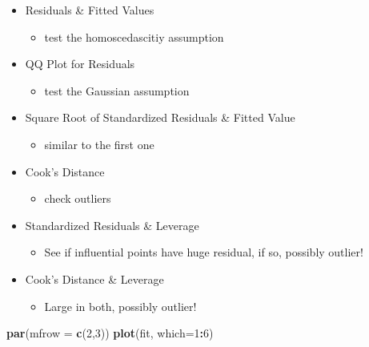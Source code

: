 \documentclass[
]{ctexart}
\newenvironment{Shaded}{\begin{snugshade}}{\end{snugshade}}
\newcommand{\AttributeTok}[1]{\textcolor[rgb]{0.13,0.29,0.53}{#1}}
\newcommand{\DecValTok}[1]{\textcolor[rgb]{0.00,0.00,0.81}{#1}}
\newcommand{\FunctionTok}[1]{\textcolor[rgb]{0.13,0.29,0.53}{\textbf{#1}}}
\newcommand{\NormalTok}[1]{#1}
\newcommand{\SpecialCharTok}[1]{\textcolor[rgb]{0.81,0.36,0.00}{\textbf{#1}}}
\providecommand{\tightlist}{%
  \setlength{\itemsep}{0pt}\setlength{\parskip}{0pt}}
\begin{document}
\begin{itemize}
\tightlist
\item
  Residuals \& Fitted Values

  \begin{itemize}
  \tightlist
  \item
    test the homoscedascitiy assumption
  \end{itemize}
\item
  QQ Plot for Residuals

  \begin{itemize}
  \tightlist
  \item
    test the Gaussian assumption
  \end{itemize}
\item
  Square Root of Standardized Residuals \& Fitted Value

  \begin{itemize}
  \tightlist
  \item
    similar to the first one
  \end{itemize}
\item
  Cook's Distance

  \begin{itemize}
  \tightlist
  \item
    check outliers
  \end{itemize}
\item
  Standardized Residuals \& Leverage

  \begin{itemize}
  \tightlist
  \item
    See if influential points have huge residual, if so, possibly
    outlier!
  \end{itemize}
\item
  Cook's Distance \& Leverage

  \begin{itemize}
  \tightlist
  \item
    Large in both, possibly outlier!
  \end{itemize}
\end{itemize}

\begin{Shaded}
\begin{Highlighting}[]
\FunctionTok{par}\NormalTok{(}\AttributeTok{mfrow =} \FunctionTok{c}\NormalTok{(}\DecValTok{2}\NormalTok{,}\DecValTok{3}\NormalTok{))}
\FunctionTok{plot}\NormalTok{(fit, }\AttributeTok{which=}\DecValTok{1}\SpecialCharTok{:}\DecValTok{6}\NormalTok{)}
\end{Highlighting}
\end{Shaded}
\end{document}
